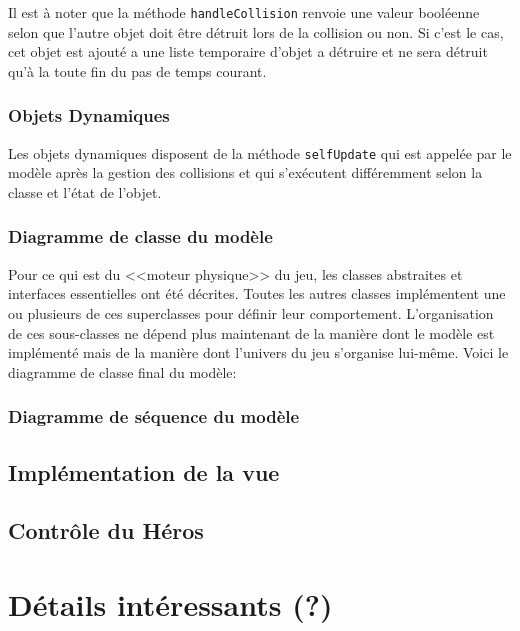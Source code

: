 \documentclass[a4paper, 12pt]{article}
\begin{document}
Il est à noter que la méthode {\tt handleCollision} renvoie une valeur booléenne selon que l'autre objet doit être détruit lors de la collision ou non. Si c'est le cas, cet objet est ajouté a une liste temporaire d'objet a détruire et ne sera détruit qu'à la toute fin du pas de temps courant.

\subsubsection{Objets Dynamiques}

Les objets dynamiques disposent de la méthode {\tt selfUpdate} qui est appelée par le modèle après la gestion des collisions et qui s'exécutent différemment selon la classe et l'état de l'objet.

\subsubsection{Diagramme de classe du modèle}

Pour ce qui est du <<moteur physique>> du jeu, les classes abstraites et interfaces essentielles ont été décrites. Toutes les autres classes implémentent une ou plusieurs de ces superclasses pour définir leur comportement. L'organisation de ces sous-classes ne dépend plus maintenant de la manière dont le modèle est implémenté mais de la manière dont l'univers du jeu s'organise lui-même.
Voici le diagramme de classe final du modèle:










\subsubsection{Diagramme de séquence du modèle}

\subsection{Implémentation de la vue}

\subsection{Contrôle du Héros}

\section{Détails intéressants (?)}
\end{document}
